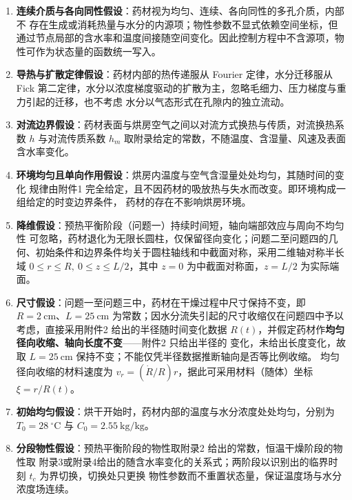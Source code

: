 \documentclass[12pt,a4paper]{ctexart}
\begin{document}
\begin{enumerate}
    \item \textbf{连续介质与各向同性假设}：药材视为均匀、连续、各向同性的多孔介质，内部不
    存在生成或消耗热量与水分的内源项；物性参数不显式依赖空间坐标，但通过节点局部的含水率和温度间接随空间变化。因此控制方程中不含源项，物性可作为状态量的函数统一写入。

    \item \textbf{导热与扩散定律假设}：药材内部的热传递服从 Fourier 定律，水分迁移服从 Fick
    第二定律，水分以浓度梯度驱动的扩散为主，忽略毛细力、压力梯度与重力引起的迁移，也不考虑
    水分以气态形式在孔隙内的独立流动。

    \item \textbf{对流边界假设}：药材表面与烘房空气之间以对流方式换热与传质，对流换热系数
    $h$ 与对流传质系数 $h_m$ 取附录给定的常数，不随温度、含湿量、风速及表面含水率变化。

    \item \textbf{环境均匀且单向作用假设}：烘房内温度与空气含湿量处处均匀，其随时间的变化
    规律由附件1 完全给定，且不因药材的吸放热与失水而改变。即环境构成一组给定的时变边界条件，
    药材的存在不影响烘房环境。

    \item \textbf{降维假设}：预热平衡阶段（问题一）持续时间短，轴向端部效应与周向不均匀性
    可忽略，药材退化为无限长圆柱，仅保留径向变化；问题二至问题四的几何、初始条件和边界条件均关于圆柱轴线和中截面对称，采用二维轴对称半长域 $0\le r\le R,\ 0\le z\le L/2$，其中 $z=0$ 为中截面对称面，$z=L/2$ 为实际端面。

    \item \textbf{尺寸假设}：问题一至问题三中，药材在干燥过程中尺寸保持不变，即
    $R=2\ \mathrm{cm}$、$L=25\ \mathrm{cm}$ 为常数；因水分流失引起的尺寸收缩仅在问题四中予以
    考虑，直接采用附件2 给出的半径随时间变化数据 $R(t)$，并假定药材作\textbf{均匀径向收缩、轴向长度不变}——附件2 只给出半径的
    变化，未给出长度变化，故取 $L=25\ \mathrm{cm}$ 保持不变；不能仅凭半径数据推断轴向是否等比例收缩。
    均匀径向收缩的材料速度为 $v_r=(\dot R/R)r$，据此可采用材料（随体）坐标 $\xi=r/R(t)$。

    \item \textbf{初始均匀假设}：烘干开始时，药材内部的温度与水分浓度处处均匀，分别为
    $T_0=28\ ^\circ\mathrm{C}$ 与 $C_0=2.55\ \mathrm{kg/kg}$。

    \item \textbf{分段物性假设}：预热平衡阶段的物性取附录2 给出的常数，恒温干燥阶段的物性取
    附录3或附录4给出的随含水率变化的关系式；两阶段以识别出的临界时刻 $t_c$ 为界切换，切换处只更换
    物性参数而不重置状态量，保证温度场与水分浓度场连续。
\end{enumerate}
\end{document}

